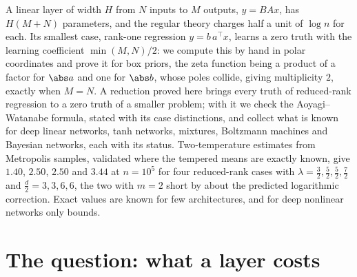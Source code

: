 \begin{refsection}

\begin{chaptersummary}
A linear layer of width $H$ from $N$ inputs to $M$ outputs, $y=BAx$, has $H(M+N)$ parameters, and the regular theory charges half a unit of $\log n$ for each. Its smallest case, rank-one regression $y=b\,a^\top x$, learns a zero truth with the learning coefficient $\min(M,N)/2$: we compute this by hand in polar coordinates and prove it for box priors, the zeta function being a product of a factor for $\abs a$ and one for $\abs b$, whose poles collide, giving multiplicity $2$, exactly when $M=N$. A reduction proved here brings every truth of reduced-rank regression to a zero truth of a smaller problem; with it we check the Aoyagi--Watanabe formula, stated with its case distinctions, and collect what is known for deep linear networks, tanh networks, mixtures, Boltzmann machines and Bayesian networks, each with its status. Two-temperature estimates from Metropolis samples, validated where the tempered means are exactly known, give $1.40$, $2.50$, $2.50$ and $3.44$ at $n=10^5$ for four reduced-rank cases with $\lambda=\tfrac32,\tfrac52,\tfrac52,\tfrac72$ and $\tfrac d2=3,3,6,6$, the two with $m=2$ short by about the predicted logarithmic correction. Exact values are known for few architectures, and for deep nonlinear networks only bounds.
\end{chaptersummary}

\section{The question: what a layer costs}\label{sec:catalogue:question}


\end{refsection}
